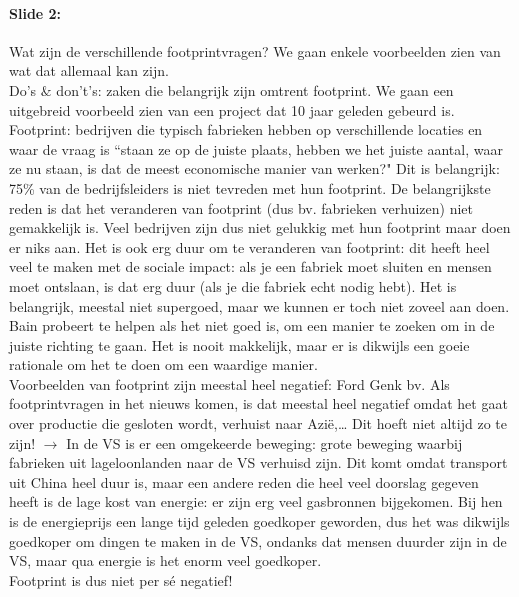 \documentclass[10pt,a4paper]{report}
\begin{document}
\paragraph{Slide 2:} Wat zijn de verschillende footprintvragen? We gaan enkele voorbeelden zien van wat dat allemaal kan zijn.\\
Do's $\&$ don't's: zaken die belangrijk zijn omtrent footprint. 
We gaan een uitgebreid voorbeeld zien van een project dat 10 jaar geleden gebeurd is.\\
Footprint: bedrijven die typisch fabrieken hebben op verschillende locaties en waar de vraag is ``staan ze op de juiste plaats, hebben we het juiste aantal, waar ze nu staan, is dat de meest economische manier van werken?" Dit is belangrijk: 75\% van de bedrijfsleiders is niet tevreden met hun footprint. De belangrijkste reden is dat het veranderen van footprint (dus bv. fabrieken verhuizen) niet gemakkelijk is. Veel bedrijven zijn dus niet gelukkig met hun footprint maar doen er niks aan. Het is ook erg duur om te veranderen van footprint: dit heeft heel veel te maken met de sociale impact: als je een fabriek moet sluiten en mensen moet ontslaan, is dat erg duur (als je die fabriek echt nodig hebt). Het is belangrijk, meestal niet supergoed, maar we kunnen er toch niet zoveel aan doen.\\
Bain probeert te helpen als het niet goed is, om een manier te zoeken om in de juiste richting te gaan. Het is nooit makkelijk, maar er is dikwijls een goeie rationale om het te doen om een waardige manier.\\
Voorbeelden van footprint zijn meestal heel negatief: Ford Genk bv. Als footprintvragen in het nieuws komen, is dat meestal heel negatief omdat het gaat over productie die gesloten wordt, verhuist naar Azi\"e,… Dit hoeft niet altijd zo te zijn! $\rightarrow$ In de VS is er een omgekeerde beweging: grote beweging waarbij fabrieken uit lageloonlanden naar de VS verhuisd zijn. Dit komt omdat transport uit China heel duur is, maar een andere reden die heel veel doorslag gegeven heeft is de lage kost van energie: er zijn erg veel gasbronnen bijgekomen. Bij hen is de energieprijs een lange tijd geleden goedkoper geworden, dus het was dikwijls goedkoper om dingen te maken in de VS, ondanks dat mensen duurder zijn in de VS, maar qua energie is het enorm veel goedkoper.\\
Footprint is dus niet per s\'e negatief!
\end{document}
